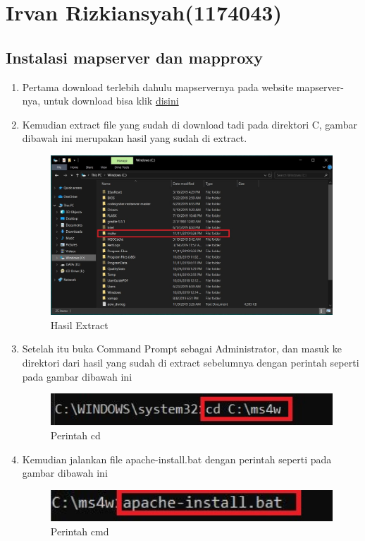 \section{Irvan Rizkiansyah(1174043)}
	\subsection{Instalasi mapserver dan mapproxy}
		\begin{enumerate}
			\item Pertama download terlebih dahulu mapservernya pada website mapserver-nya, untuk download bisa klik \href{https://mapserver.org/} {disini}
			
			\item Kemudian extract file yang sudah di download tadi pada direktori C, gambar dibawah ini merupakan hasil yang sudah di extract.
				\begin{figure}[H]
					\includegraphics[width=12cm]{figures/1174043/TUGAS4/1.JPG}
					\centering
					\caption{Hasil Extract}
				\end{figure}
			
			\item Setelah itu buka Command Prompt sebagai Administrator, dan masuk ke direktori dari hasil yang sudah di extract sebelumnya dengan perintah seperti pada gambar dibawah ini
				\begin{figure}[H]
					\includegraphics[width=12cm]{figures/1174043/TUGAS4/2.JPG}
					\centering
					\caption{Perintah cd}
				\end{figure}
				
			\item Kemudian jalankan file apache-install.bat dengan perintah seperti pada gambar dibawah ini
				\begin{figure}[H]
					\includegraphics[width=12cm]{figures/1174043/TUGAS4/3.JPG}
					\centering
					\caption{Perintah cmd}
				\end{figure}
				

\end{enumerate}
